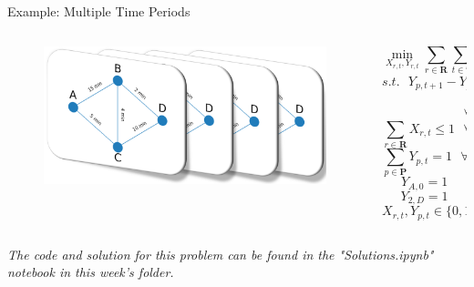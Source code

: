 \documentclass[10pt, aspectratio=169]{beamer}
\begin{document}
\begin{frame}{Example: Multiple Time Periods}
    \begin{columns}
        \begin{column}{0.5\textwidth}
            \begin{figure}
                \includegraphics[width=0.7\linewidth]{RoutePlanningProblemRepeated.png}
            \end{figure}
        \end{column}
        \begin{column}{0.5\textwidth}
            $$\min_{X_{r,t},Y_{r,t}} \sum_{r \in \textbf{R}} \sum_{t \in \textbf{T}} \delta_{r,t} X_{r,t}$$
            $$s.t.\ \ \ Y_{p,t+1} - Y_{p,t} = \sum_{r\in\textbf{R}^+_p} X_{r,t} - \sum_{r\in\textbf{R}^-_p} X_{r,t}$$
            $$\phantom\ \ \ \ \ \ \ \ \ \ \ \ \ \ \ \ \ \ \ \ \ \ \ \ \ \ \ \ \ \forall p \in \textbf{P}, t \in \textbf{T} \neq 3$$
            $$\sum_{r \in \textbf{R}} X_{r,t} \leq 1 \ \ \ \forall t \in \textbf{T}$$
            $$\sum_{p \in \textbf{P}} Y_{p,t} = 1 \ \ \ \forall t \in \textbf{T}$$
            $$Y_{A,0} = 1$$
            $$Y_{2,D} = 1$$
            $$X_{r,t}, Y_{p,t} \in \{0,1\}$$
        \end{column}
    \end{columns}
    \begin{center}
        \textit{The code and solution for this problem can be found in the "Solutions.ipynb" notebook in this week's folder.}
    \end{center}
\end{frame}
\end{document}
